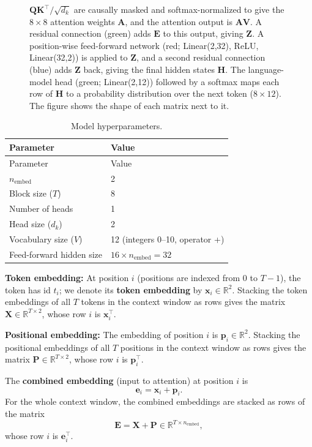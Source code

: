 \documentclass[
  11pt,
  a4paper,
]{article}
\begin{document}
\begin{figure}
{\(\mathbf{Q}\mathbf{K}^\top/\sqrt{d_k}\) are causally masked and
softmax-normalized to give the \(8 \times 8\) attention weights
\(\mathbf{A}\), and the attention output is \(\mathbf{A}\mathbf{V}\). A
residual connection (green) adds \(\mathbf{E}\) to this output, giving
\(\mathbf{Z}\). A position-wise feed-forward network (red; Linear(2,32),
ReLU, Linear(32,2)) is applied to \(\mathbf{Z}\), and a second residual
connection (blue) adds \(\mathbf{Z}\) back, giving the final hidden
states \(\mathbf{H}\). The language-model head (green; Linear(2,12))
followed by a softmax maps each row of \(\mathbf{H}\) to a probability
distribution over the next token (\(8 \times 12\)). The figure shows the
shape of each matrix next to it.}
\end{figure}

\begin{longtable}[]{@{}ll@{}}
\caption{Model hyperparameters.}\label{tbl:hyperparams}\tabularnewline
\toprule\noalign{}
Parameter & Value \\
\midrule\noalign{}
\endfirsthead
\toprule\noalign{}
Parameter & Value \\
\midrule\noalign{}
\endhead
\bottomrule\noalign{}
\endlastfoot
\(n_{\mathrm{embed}}\) & 2 \\
Block size (\(T\)) & 8 \\
Number of heads & 1 \\
Head size (\(d_k\)) & 2 \\
Vocabulary size (\(V\)) & 12 (integers 0--10, operator +) \\
Feed-forward hidden size & \(16 \times n_{\mathrm{embed}} = 32\) \\
\end{longtable}

\textbf{Token embedding:} At position \(i\) (positions are indexed from
\(0\) to \(T-1\)), the token has id \(t_i\); we denote its \textbf{token
embedding} by \(\mathbf{x}_i \in \mathbb{R}^2\). Stacking the token
embeddings of all \(T\) tokens in the context window as rows gives the
matrix \(\mathbf{X} \in \mathbb{R}^{T \times 2}\), whose row \(i\) is
\(\mathbf{x}_i^\top\).

\textbf{Positional embedding:} The embedding of position \(i\) is
\(\mathbf{p}_i \in \mathbb{R}^2\). Stacking the positional embeddings of
all \(T\) positions in the context window as rows gives the matrix
\(\mathbf{P} \in \mathbb{R}^{T \times 2}\), whose row \(i\) is
\(\mathbf{p}_i^\top\).

The \textbf{combined embedding} (input to attention) at position \(i\)
is \[
\mathbf{e}_i = \mathbf{x}_i + \mathbf{p}_i.
\] For the whole context window, the combined embeddings are stacked as
rows of the matrix \[
\mathbf{E} = \mathbf{X} + \mathbf{P} \in \mathbb{R}^{T \times n_{\mathrm{embed}}},
\] whose row \(i\) is \(\mathbf{e}_i^\top\).
\end{document}
